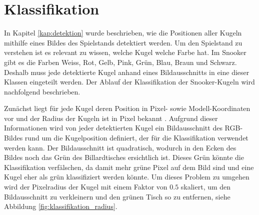 \newpage
\section{Klassifikation}\label{kap:klassifikation}
In Kapitel \ref{kap:detektion} wurde beschrieben, wie die Positionen aller Kugeln mithilfe eines Bildes des Spielstands detektiert werden.
Um den Spielstand zu verstehen ist es relevant zu wissen, welche Kugel welche Farbe hat.
Im Snooker gibt es die Farben Weiss, Rot, Gelb, Pink, Grün, Blau, Braun und Schwarz.
Deshalb muss jede detektierte Kugel anhand eines Bildausschnitts in eine dieser Klassen eingeteilt werden.
Der Ablauf der Klassifikation der Snooker-Kugeln wird nachfolgend beschrieben.

Zunächst liegt für jede Kugel deren Position in Pixel- sowie Modell-Koordinaten vor und der Radius der Kugeln ist in Pixel bekannt \cite{project2:pixel_to_model_coordinates}.
Aufgrund dieser Informationen wird von jeder detektierten Kugel ein Bildausschnitt des RGB-Bildes rund um die Kugelposition definiert,
der für die Klassifikation verwendet werden kann.
Der Bildausschnitt ist quadratisch, wodurch in den Ecken des Bildes noch das Grün des Billardtisches ersichtlich ist.
Dieses Grün könnte die Klassifikation verfälschen, da damit mehr grüne Pixel auf dem Bild sind und eine Kugel eher als grün klassifiziert werden könnte.
Um dieses Problem zu umgehen wird der Pixelradius der Kugel mit einem Faktor von $0.5$ skaliert, um den Bildausschnitt zu verkleinern
und den grünen Tisch so zu entfernen, siehe Abbildung \ref{fig:klassifikation_radius}.

